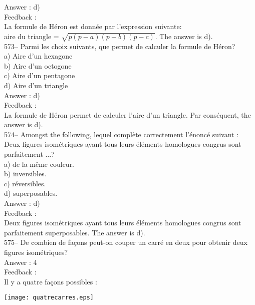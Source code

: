 ﻿\documentclass[letterpaper, 12pt]{article}
\begin{document}
Answer : d)\\

Feedback : \\
La formule de H\'eron est donn\'ee par l'expression suivante:\\
aire du triangle = $\sqrt{p\left( p-a\right) \left( p-b\right) \left(
p-c\right) }$.  The answer is d).\\

573-- Parmi les choix suivants, que permet de calculer la formule de
H\'eron?\\
a) Aire d'un hexagone\\
b) Aire d'un octogone\\
c) Aire d'un pentagone\\
d) Aire d'un triangle\\

Answer : d) \\

Feedback : \\
La formule de H\'eron permet de calculer l'aire d'un triangle.  Par
cons\'equent, the answer is d).\\



574-- Amongst the following, lequel compl\`ete
correctement l'\'enonc\'e suivant : \og Deux figures isom\'etriques
ayant tous leurs \'el\'ements homologues congrus sont parfaitement $\ldots$\fg ?\\
a) de la m\^eme couleur.\\
b) inversibles.\\
c) r\'eversibles.\\
d) superposables.\\

Answer : d)\\

Feedback : \\
Deux figures isom\'etriques ayant tous leurs \'el\'ements homologues congrus
sont parfaitement superposables.  The answer is d).\\

575-- De combien de fa\c cons peut-on couper un carr\'e en deux pour obtenir
deux figures isom\'etriques?\\

Answer : 4\\

Feedback : \\
Il y a quatre fa\c cons possibles :   \\
    \begin{center}
    \texttt{[image: quatrecarres.eps]}
    \end{center}
\end{document}
